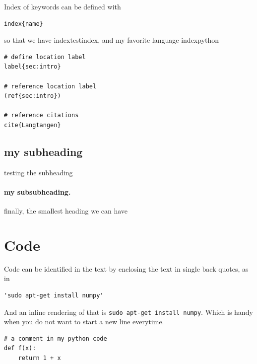 \documentclass[%
twocolumn,
twoside,                 %
final,                   %
10pt]{article}
\begin{document}
Index of keywords can be defined with 
\begin{verbatim}
index{name}
\end{verbatim}

so that we have index{testindex}, and my favorite language index{python}

\begin{verbatim}
# define location label
label{sec:intro}

# reference location label
(ref{sec:intro})

# reference citations
cite{Langtangen}

\end{verbatim}


\subsection{my subheading}
testing the subheading

\paragraph{my subsubheading.}
finally, the smallest heading we can have


\section{Code}
\label{sec:code}

Code can be identified in the text by enclosing the text in single back quotes, as in 

\begin{verbatim}
'sudo apt-get install numpy'
\end{verbatim}

And an inline rendering of that is \Verb!sudo apt-get install numpy!. Which is handy when you do not want to start a new line everytime.



\begin{verbatim}
# a comment in my python code
def f(x):
    return 1 + x
\end{verbatim}
\end{document}
